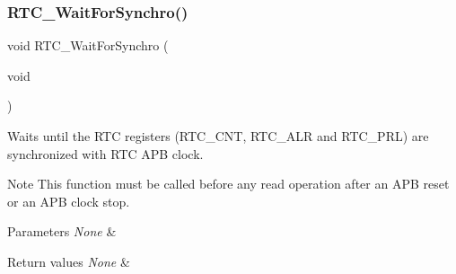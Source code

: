 \subsubsection{\texorpdfstring{RTC\_WaitForSynchro()}{RTC\_WaitForSynchro()}}
{\footnotesize\ttfamily void R\+T\+C\+\_\+\+Wait\+For\+Synchro (\begin{DoxyParamCaption}\item[{void}]{ }\end{DoxyParamCaption})}



Waits until the R\+TC registers (R\+T\+C\+\_\+\+C\+NT, R\+T\+C\+\_\+\+A\+LR and R\+T\+C\+\_\+\+P\+RL) are synchronized with R\+TC A\+PB clock. 

\begin{DoxyNote}{Note}
This function must be called before any read operation after an A\+PB reset or an A\+PB clock stop. 
\end{DoxyNote}

\begin{DoxyParams}{Parameters}
{\em None} & \\
\hline
\end{DoxyParams}

\begin{DoxyRetVals}{Return values}
{\em None} & \\
\hline
\end{DoxyRetVals}
